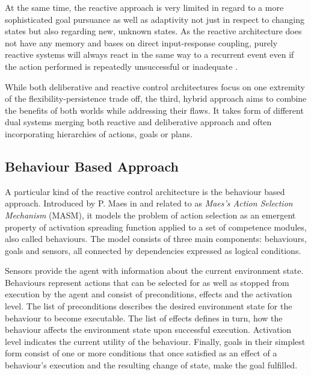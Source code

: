 At the same time, the reactive approach is very limited in regard to a more sophisticated goal pursuance as well as adaptivity not just in respect to changing states but also regarding new, unknown states. As the reactive architecture does not have any memory and bases on direct input-response coupling, purely reactive systems will always react in the same way to a recurrent event even if the action performed is repeatedly unsuccessful or inadequate \cite{attractors}.\par
While both deliberative and reactive control architectures focus on one extremity of the flexibility-persistence trade off, the third, hybrid approach aims to combine the benefits of both worlds while addressing their flaws. It takes form of different dual systems merging both reactive and deliberative approach and often incorporating hierarchies of actions, goals or plans.
\subsection{Behaviour Based Approach}
A particular kind of the reactive control architecture is the behaviour based approach. Introduced by P. Maes in \cite{maes} and related to as \textit{Maes's Action Selection Mechanism} (MASM), it models the problem of action selection as an emergent property of activation spreading function applied to a set of competence modules, also called behaviours. The model consists of three main components: behaviours, goals and sensors, all connected by dependencies expressed as logical conditions.\par
Sensors provide the agent with information about the current environment state. Behaviours represent actions that can be selected for as well as stopped from execution by the agent and consist of preconditions, effects and the activation level. The list of preconditions describes the desired environment state for the behaviour to become executable. The list of effects defines in turn, how the behaviour affects the environment state upon successful execution. Activation level indicates the current utility of the behaviour. Finally, goals in their simplest form consist of one or more conditions that once satisfied as an effect of a behaviour's execution and the resulting change of state, make the goal fulfilled.
